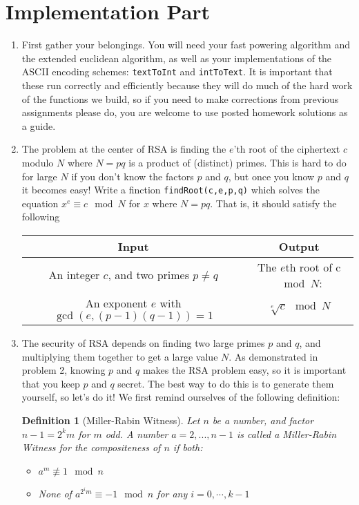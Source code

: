 \documentclass[11pt]{article}
\newtheorem{definition}{Definition}
\begin{document}
\section*{Implementation Part}
\begin{enumerate}
  \item{
  First gather your belongings.  You will need your fast powering algorithm and the extended euclidean algorithm, as well as your implementations of the ASCII encoding schemes: \verb|textToInt| and \verb|intToText|.  It is important that these run correctly and efficiently because they will do much of the hard work of the functions we build, so if you need to make corrections from previous assignments please do, you are welcome to use posted homework solutions as a guide.
  }
  \item{
  The problem at the center of RSA is finding the $e$'th root of the ciphertext $c$ modulo $N$ where $N=pq$ is a product of (distinct) primes.  This is hard to do for large $N$ if you don't know the factors $p$ and $q$, but once you know $p$ and $q$ it becomes easy!  Write a finction \verb|findRoot(c,e,p,q)| which solves the equation $x^e\equiv c\mod N$ for $x$ where $N=pq$.  That is, it should satisfy the following
  \begin{center}
    \begin{tabular}{c|c}
      Input & Output\\
      \hline
      An integer $c$, and two primes $p\not=q$ & The $e$th root of c$\mod N$:\\
      An exponent $e$ with $\gcd(e,(p-1)(q-1))=1$ & $\sqrt[e]{c}\mod N$
    \end{tabular}
  \end{center}
  }
  \item{
  The security of RSA depends on finding two large primes $p$ and $q$, and multiplying them together to get a large value $N$.  As demonstrated in problem 2, knowing $p$ and $q$ makes the RSA problem easy, so it is important that you keep $p$ and $q$ secret.  The best way to do this is to generate them yourself, so let's do it!  We first remind ourselves of the following definition:
  \begin{definition}[Miller-Rabin Witness]
    Let $n$ be a number, and factor $n-1 = 2^k m$ for $m$ odd.  A number $a=2,...,n-1$ is called a \textit{Miller-Rabin Witness} for the compositeness of $n$ if both:
    \begin{itemize}
      \item{$a^m\not\equiv1\mod n$}
      \item{None of $a^{2^im}\equiv-1\mod n$ for any $i=0,\cdots,k-1$}

\end{itemize}
\end{definition}}
\end{enumerate}
\end{document}
